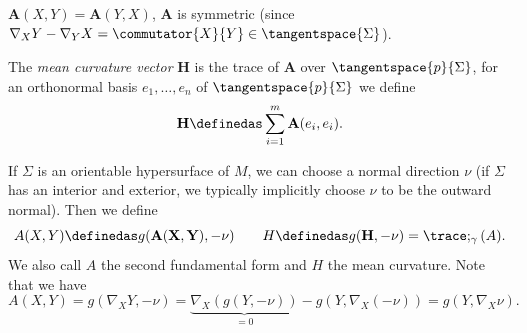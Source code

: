 \documentclass[titlepage,numbers=noenddot,headinclude,oneside,%
footinclude=true,cleardoublepage=empty,%
BCOR=5mm,paper=a4,fontsize=11pt,%
english,%
]{scrartcl}
\begin{document}
{\begin{fact}
    \( \mathbf{A}(X,Y)=\mathbf{A}(Y,X) \), \ie \( \mathbf{A} \) is symmetric (since \( \Mconnection_X Y-\Mconnection_Y X=\commutator{X}{Y}\in \tangentspace{\Sigma} \)). 
\end{fact}
\begin{definition}
    The \emph{mean curvature vector} \( \mathbf{H} \) is the trace of \( \mathbf{A} \) over \( \tangentspace{p}{\Sigma} \), \ie for an orthonormal basis \( e_1,\dotsc,e_n \) of \( \tangentspace{p}{\Sigma} \) we define
    \begin{equation*}
        \mathbf{H}\definedas \sum_{i=1}^{m}\mathbf{A}(e_i,e_i).
    \end{equation*}
\end{definition}
If \( \Sigma \) is an orientable hypersurface of \( M \), we can choose a normal direction \( \nu \) (if \( \Sigma \) has an interior and exterior, we typically implicitly choose \( \nu \) to be the outward normal). Then we define
\begin{equation*}
    A(X,Y)\definedas g(\mathbf{A(X,Y)},-\nu)\qquad H\definedas g(\mathbf{H},-\nu)=\trace;_\gamma(A).
\end{equation*}
We also call \( A \) the second fundamental form and \( H \) the mean curvature. Note that we have
\begin{equation*}
    A(X,Y)=g(\nabla_X Y,-\nu)=\underbrace{\nabla_X (g(Y,-\nu))}_{=0}-g(Y,\nabla_X (-\nu))=g(Y,\nabla_X \nu).
\end{equation*}

}
\end{document}
